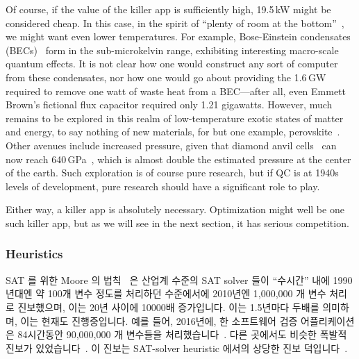 Of course, if the value of the killer app is sufficiently high,
19.5\,kW might be considered cheap.
In this case, in the spirit of
``plenty of room at the bottom''~\cite{RichardPFeynman1959RoomAtBottom},
we might want even lower temperatures.
For example, Bose-Einstein condensates
(BECs)~\cite{NIST2001BoseEinsteinCondensate}
form in the sub-microkelvin range, exhibiting interesting
macro-scale quantum effects.
It is not clear how one would construct any sort of computer from
these condensates, nor how one would go about providing the 1.6\,GW
required to remove one watt of waste heat from a BEC---after all,
even Emmett Brown's fictional flux capacitor required only 1.21 gigawatts.
However, much remains to be explored in this realm
of low-temperature exotic states of matter and energy, to say
nothing of new materials, for but one example,
perovskite~\cite{ZhengChen2016PerovskiteQDMOFthinFilm}.
Other avenues include increased pressure, given that diamond anvil
cells~\cite{Weir1959DiamondAnvilCell} can now reach
640\,GPa~\cite{LeonidDubrovinsky2012640GPaDiamondAnvilCell},
which is almost double the estimated pressure at the center of the earth.
Such exploration is of course pure research, but if QC is at 1940s levels
of development, pure research should have a significant role to play.

Either way, a killer app is absolutely necessary.
Optimization might well be one such killer app, but as we will see in the
next section, it has serious competition.
\fi

\subsubsection{Heuristics}
\label{sec:future:Heuristics}

SAT 를 위한 Moore 의 법칙~\cite[Fig.~2.3]{Kroening:2008:DPA:1391237} 은 산업계
수준의 SAT solver 들이 ``수시간'' 내에 1990년대엔 약 100개 변수 정도를 처리하던
수준에서에 2010년엔 1,000,000 개 변수 처리로 진보했으며, 이는 20년 사이에
10000배 증가입니다.
이는 1.5년마다 두배를 의미하며, 이는 현재도 진행중입니다.
예를 들어, 2016년에, 한 소프트웨어 검증 어플리케이션은 84시간동안 90,000,000 개
변수들을 처리했습니다~\cite{LihaoLiang2016VerifyTreeRCU}.
다른 곳에서도 비슷한 폭발적 진보가
있었습니다~\cite{SharadMalik2010SATSolverHistory,SATCompetition2002,vanHarmelen:2007:HKR:1557461,Malik:2009:BST:1536616.1536637,JamesEzick2014ExtremeSAT}.
이 진보는 SAT-solver heuristic 에서의 상당한 진보
덕입니다~\cite{Kroening:2008:DPA:1391237,Zhang:2002:QEB:647771.734434,SharadMalik2010SATSolverHistory,Malik:2009:BST:1536616.1536637,Audemard:2009:PLC:1661445.1661509}.
\iffalse

